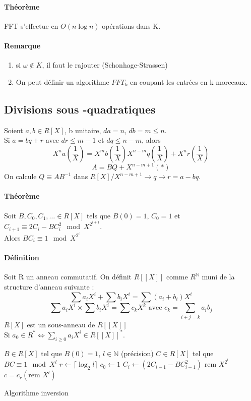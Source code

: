 \documentclass[12pt,a4paper]{report}
\begin{document}
\paragraph{Théorème\\}
FFT s'effectue en $O(n \log n)$ opérations dans K.
\paragraph{Remarque\\}
\begin{enumerate}
\item si $\omega \not \in K$, il faut le rajouter (Schonhage-Strassen)
\item On peut définir un algorithme $FFT_k$ en coupant les entrées en k morceaux.
\end{enumerate}
\subsection*{Divisions sous -quadratiques}
Soient $ a, b \in R[X]$, b unitaire, $da=n$, $db=m \leqslant n$.\\
Si $ a = bq+r$ avec $dr \leqslant m-1$ et $dq\leqslant n-m$, alors 
$$ X^n a\left( \frac{1}{X} \right) = X^m b\left( \frac{1}{X} \right)X^{n-m} q\left( \frac{1}{X} \right) + X^n r\left( \frac{1}{X} \right)$$
$$ A = BQ + X^{n-m+1} (*)$$
On calcule $Q \equiv A B^{-1} $ dans $ R[X]/X^{n-m+1} \rightarrow q \rightarrow r = a-bq $.
\paragraph{Théorème\\}
Soit $B,C_0,C_1,\ldots \in R[X]$ tels que $ B(0)=1$, $C_0=1$ et $\displaystyle C_{i+1} \equiv 2C_i -BC_i^2 \mod X^{2^{i+1}}$.\\
Alors $\displaystyle BC_i \equiv 1 \mod X^{2^i} $
\paragraph{Définition\\}
Soit R un anneau commutatif. On définit $R[[X]]$ comme $R^{\mathbb{N}}$ muni de la structure d'anneau suivante : 
$$ \sum a_i X^i + \sum b_i X^i = \sum (a_i+b_i) X^i $$
$$ \sum a_i X^i  \times \sum b_i X^i = \sum c_k X^k \mbox{ avec } c_k=\sum_{i+j=k}a_ib_j$$
$R[X]$ est un sous-anneau de $ R[[X]]$\\
Si $\displaystyle a_0 \in R^* \Leftrightarrow \sum_{i\geqslant 0} a_i X^i \in  R[[X]]^*$.
\begin{algorithm}[h!]
\begin{algorithmic}[1]
\REQUIRE $B \in R[X]$ tel que $B(0)=1$, $l\in \mathbb{N}$ (précision)
\ENSURE$C \in R[X]$ tel que $BC \equiv 1 \mod X^l$
\STATE $r\leftarrow \lceil\log_2 l\rceil$
$ c_0 \leftarrow 1$
\STATE $C_i \leftarrow (2C_{i-1} - BC_{i-1}^2) \mbox{ rem } X^{2^i} $
\ENDFOR
\RETURN $c=c_r (\mbox{rem } X^l)$
\end{algorithmic}
\caption{Algorithme inversion}
\end{algorithm}
\end{document}
